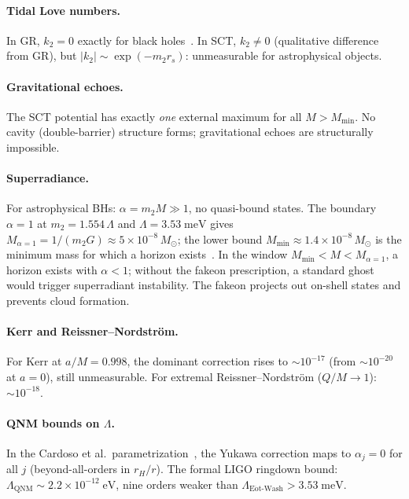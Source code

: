 \documentclass[12pt,a4paper]{article}
\theoremstyle{plain}
\theoremstyle{definition}
\theoremstyle{remark}
\begin{document}
\paragraph{Tidal Love numbers.}
In GR, $k_2 = 0$ exactly for black holes~\cite{BinningtonPoisson:2009}.
In SCT, $k_2 \neq 0$ (qualitative difference from GR), but
$|k_2| \sim \exp(-m_2 r_s)$: unmeasurable for astrophysical objects.

\paragraph{Gravitational echoes.}
The SCT potential has exactly \emph{one} external maximum for all
$M > M_{\min}$. No cavity (double-barrier) structure forms;
gravitational echoes are structurally impossible.

\paragraph{Superradiance.}
For astrophysical BHs: $\alpha = m_2 M \gg 1$, no quasi-bound
states.  The boundary $\alpha = 1$ at
$m_2 = 1.554\,\Lambda$ and $\Lambda = 3.53\;\mathrm{meV}$ gives
$M_{\alpha=1} = 1/(m_2 G) \approx 5 \times 10^{-8}\,M_\odot$;
the lower bound $M_{\min} \approx 1.4 \times 10^{-8}\,M_\odot$
is the minimum mass for which a horizon
exists~\cite{Alfyorov:2026paper2}.  In the window
$M_{\min} < M < M_{\alpha=1}$, a horizon exists with $\alpha < 1$;
without the fakeon prescription, a standard ghost would trigger
superradiant instability.  The fakeon projects out on-shell states
and prevents cloud formation.

\paragraph{Kerr and Reissner--Nordstr\"om.}
For Kerr at $a/M = 0.998$, the dominant correction rises to
$\sim 10^{-17}$ (from $\sim 10^{-20}$ at $a = 0$), still unmeasurable.
For extremal Reissner--Nordstr\"om ($Q/M \to 1$): $\sim 10^{-18}$.

\paragraph{QNM bounds on $\Lambda$.}
In the Cardoso et al.\ parametrization~\cite{Cardoso:2019},
the Yukawa correction maps to $\alpha_j = 0$ for all $j$
(beyond-all-orders in $r_H/r$). The formal LIGO ringdown bound:
$\Lambda_{\mathrm{QNM}} \sim 2.2 \times 10^{-12}\;\mathrm{eV}$,
nine orders weaker than $\Lambda_{\mathrm{E\ddot{o}t\text{-}Wash}} > 3.53\;\mathrm{meV}$.
\end{document}
